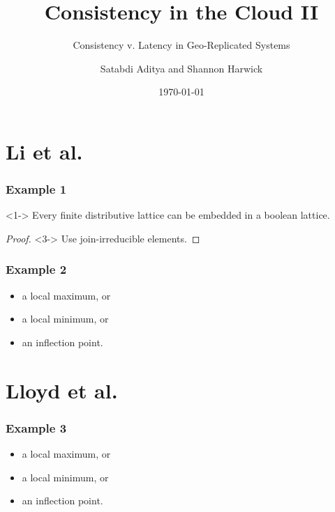 \documentclass{beamer}
\title{Consistency in the Cloud II}
\subtitle{Consistency v. Latency in Geo-Replicated Systems}
\author{Satabdi Aditya and Shannon Harwick}
\institute{University of Illinois at Chicago}
\date{\today}
\begin{document}
\begin{frame}[plain]
  \titlepage
\end{frame}



\section{Li et al.} 
\begin{frame}
\frametitle{Example 1}

\begin{theorem}<1->
Every finite distributive lattice can be embedded in a boolean lattice.
\end{theorem}
\begin{proof}<3->
Use join-irreducible elements.
\end{proof}
\end{frame}



\begin{frame}
\frametitle{Example 2}
\begin{itemize}
\pause \item a local maximum, or %
\pause \item a local minimum, or
\pause \item an inflection point.
\end{itemize}  
\end{frame}


\section{Lloyd et al.} 

\begin{frame}
\frametitle{Example 3}
\begin{itemize}
\pause \item a local maximum, or %
\pause \item a local minimum, or
\pause \item an inflection point.
\end{itemize}  
\end{frame}
\end{document}
